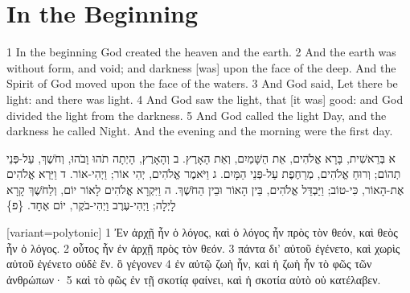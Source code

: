\documentclass{article}
\begin{document}
\section{In the Beginning}

1 In the beginning God created the heaven and the earth.
2 And the earth was without form, and void; and darkness [was] upon the face of the deep. And the Spirit of God moved upon the face of the waters.
3 And God said, Let there be light: and there was light.
4 And God saw the light, that [it was] good: and God divided the light from the darkness.
5 And God called the light Day, and the darkness he called Night. And the evening and the morning were the first day.

\begin{hebrew}
א  בְּרֵאשִׁית, בָּרָא אֱלֹהִים, אֵת הַשָּׁמַיִם, וְאֵת הָאָרֶץ. 
ב  וְהָאָרֶץ, הָיְתָה תֹהוּ וָבֹהוּ, וְחֹשֶׁךְ, עַל-פְּנֵי תְהוֹם; וְרוּחַ אֱלֹהִים, מְרַחֶפֶת עַל-פְּנֵי הַמָּיִם. 
ג  וַיֹּאמֶר אֱלֹהִים, יְהִי אוֹר; וַיְהִי-אוֹר. 
ד  וַיַּרְא אֱלֹהִים אֶת-הָאוֹר, כִּי-טוֹב; וַיַּבְדֵּל אֱלֹהִים, בֵּין הָאוֹר וּבֵין הַחֹשֶׁךְ. 
ה  וַיִּקְרָא אֱלֹהִים לָאוֹר יוֹם, וְלַחֹשֶׁךְ קָרָא לָיְלָה; וַיְהִי-עֶרֶב וַיְהִי-בֹקֶר, יוֹם אֶחָד.  \{פ\} 
\end{hebrew}

\begin{greek}[variant=polytonic]
1 Ἐν ἀρχῇ ἦν ὁ λόγος, καὶ ὁ λόγος ἦν πρὸς τὸν θεόν, καὶ θεὸς ἦν ὁ λόγος. 
2 οὗτος ἦν ἐν ἀρχῇ πρὸς τὸν θεόν. 
3 πάντα δι’ αὐτοῦ ἐγένετο, καὶ χωρὶς αὐτοῦ ἐγένετο οὐδὲ ἕν. ὃ γέγονεν 
4 ἐν αὐτῷ ζωὴ ἦν, καὶ ἡ ζωὴ ἦν τὸ φῶς τῶν ἀνθρώπων· 
5 καὶ τὸ φῶς ἐν τῇ σκοτίᾳ φαίνει, καὶ ἡ σκοτία αὐτὸ οὐ κατέλαβεν. 
\end{greek}
\end{document}
